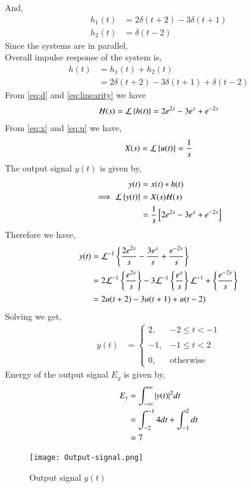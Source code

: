 \documentclass[journal,12pt,twocolumn]{IEEEtran}
\begin{document}
And,
\begin{align}
    h_1(t) &= 2\delta(t+2) - 3\delta(t+1)\\
    h_2(t) &= \delta(t-2)
\end{align}
Since the systems are in parallel,\\
Overall impulse response of the system is,
\begin{align}
    h(t) &= h_1(t) + h_2(t)\\  &= 2\delta(t+2) - 3\delta(t+1) + \delta(t-2)
\end{align}
From \eqref{eq:d} and \eqref{eq:linearity} we have
\begin{align}
    H(s) = \mathcal{L}\left\{h(t)\right\} = 2e^{2s}-3e^{s}+e^{-2s}
\end{align}
From \eqref{eq:x} and \eqref{eq:u} we have,
\begin{align}
    X(s) = \mathcal{L}\left\{u(t)\right\} = \frac{1}{s}
\end{align}
The output signal $y(t)$ is given by,
\begin{align}
    y(t) &= x(t)*h(t)\\ 
    \implies \mathcal{L}\left\{y(t)\right\} &= X(s)H(s)\\
    &= \frac{1}{s}{}\left[2e^{2s}-3e^{s}+e^{-2s}\right]
\end{align}
Therefore we have,
\begin{align}
    y(t) &= \mathcal{L}^{-1}\left\{\frac{2e^{2s}}{s}-\frac{3e^{s}}{s}+\frac{e^{-2s}}{s}\right\}\\
    &=2\mathcal{L}^{-1}\left\{\frac{e^{2s}}{s}\right\}-3\mathcal{L}^{-1}\left\{\frac{e^{s}}{s}\right\}\mathcal{L}^{-1}+\left\{\frac{e^{-2s}}{s}\right\}\\
     &= 2u(t+2) -3u(t+1) + u(t-2) 
\end{align}
Solving we get,
\begin{align}
      y(t) &= 
     \begin{cases}
    2, & -2 \leq t < -1 \\~\\[-1em]
	-1, & -1 \leq t < 2 \\~\\[-1em]
	0, & \text{otherwise}
	\end{cases}
\end{align}
Energy of the output signal $E_y$ is given by,
\begin{align}
    E_y &= \int_{-\infty}^{\infty}\vert y(t)\vert^2dt\\
    &= \int_{-2}^{-1}4dt + \int_{-1}^{2}dt\\
    &= 7
\end{align}
\begin{figure}[h!]
\centering
\texttt{[image: Output-signal.png]}
\caption{Output signal $y(t)$}
\label{fig:ellipse}
\end{figure}
\end{document}
